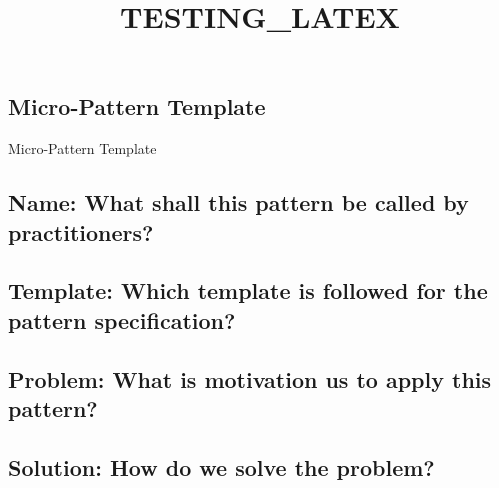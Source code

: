 
\title{TESTING_LATEX}
\maketitle
\subsection{Micro-Pattern Template}
Micro-Pattern Template
\subsection{Name: What shall this pattern be called by practitioners?}

\subsection{Template: Which template is followed for the pattern specification?}

\subsection{Problem: What is motivation us to apply this pattern?}

\subsection{Solution: How do we solve the problem?}


